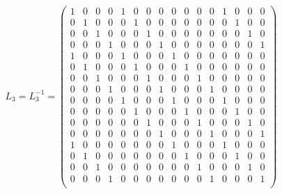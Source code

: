 \documentclass{transcrypto}
\begin{document}
\begin{appendices}
	\begin{equation*}
	L_3 = L_3^{-1} = 
	\begin{pmatrix}
	1 & 0 & 0 & 0 & 1 & 0 & 0 & 0 & 0 & 0 & 0 & 0 & 1 & 0 & 0 & 0 \\
	0 & 1 & 0 & 0 & 0 & 1 & 0 & 0 & 0 & 0 & 0 & 0 & 0 & 1 & 0 & 0 \\
	0 & 0 & 1 & 0 & 0 & 0 & 1 & 0 & 0 & 0 & 0 & 0 & 0 & 0 & 1 & 0 \\   
	0 & 0 & 0 & 1 & 0 & 0 & 0 & 1 & 0 & 0 & 0 & 0 & 0 & 0 & 0 & 1 \\
	1 & 0 & 0 & 0 & 1 & 0 & 0 & 0 & 1 & 0 & 0 & 0 & 0 & 0 & 0 & 0 \\
	0 & 1 & 0 & 0 & 0 & 1 & 0 & 0 & 0 & 1 & 0 & 0 & 0 & 0 & 0 & 0 \\   
	0 & 0 & 1 & 0 & 0 & 0 & 1 & 0 & 0 & 0 & 1 & 0 & 0 & 0 & 0 & 0 \\
	0 & 0 & 0 & 1 & 0 & 0 & 0 & 1 & 0 & 0 & 0 & 1 & 0 & 0 & 0 & 0 \\
	0 & 0 & 0 & 0 & 1 & 0 & 0 & 0 & 1 & 0 & 0 & 0 & 1 & 0 & 0 & 0 \\
	0 & 0 & 0 & 0 & 0 & 1 & 0 & 0 & 0 & 1 & 0 & 0 & 0 & 1 & 0 & 0 \\
	0 & 0 & 0 & 0 & 0 & 0 & 1 & 0 & 0 & 0 & 1 & 0 & 0 & 0 & 1 & 0 \\
	0 & 0 & 0 & 0 & 0 & 0 & 0 & 1 & 0 & 0 & 0 & 1 & 0 & 0 & 0 & 1 \\
	1 & 0 & 0 & 0 & 0 & 0 & 0 & 0 & 1 & 0 & 0 & 0 & 1 & 0 & 0 & 0 \\
	0 & 1 & 0 & 0 & 0 & 0 & 0 & 0 & 0 & 1 & 0 & 0 & 0 & 1 & 0 & 0 \\
	0 & 0 & 1 & 0 & 0 & 0 & 0 & 0 & 0 & 0 & 1 & 0 & 0 & 0 & 1 & 0 \\
	0 & 0 & 0 & 1 & 0 & 0 & 0 & 0 & 0 & 0 & 0 & 1 & 0 & 0 & 0 & 1 \\
	\end{pmatrix}
	\end{equation*}
	

\end{appendices}
\end{document}
